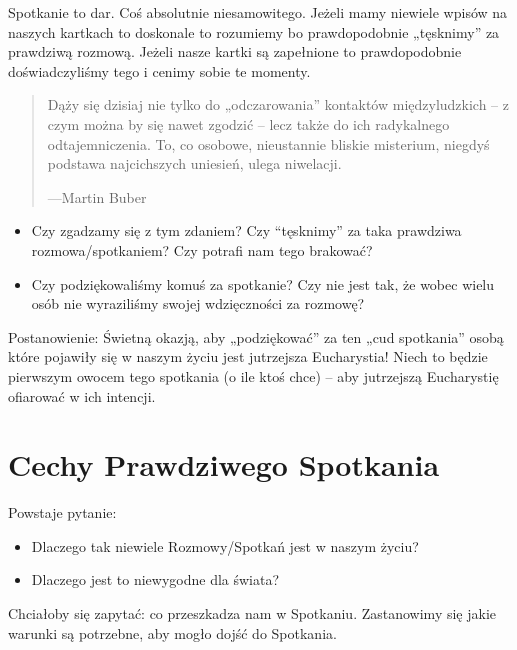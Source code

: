 \documentclass[a5paper,10pt,polish]{book}
\begin{document}
Spotkanie to dar. Coś absolutnie niesamowitego. Jeżeli mamy niewiele wpisów na naszych kartkach to doskonale to rozumiemy bo prawdopodobnie „tęsknimy” za prawdziwą rozmową. Jeżeli nasze kartki są zapełnione to prawdopodobnie doświadczyliśmy tego i cenimy sobie te momenty.
\begin{quote}

Dąży się dzisiaj nie tylko do „odczarowania” kontaktów międzyludzkich – z czym można by się nawet zgodzić – lecz także do ich radykalnego odtajemniczenia. To, co osobowe, nieustannie bliskie misterium, niegdyś podstawa najcichszych uniesień, ulega niwelacji.

\begin{flushright}
---Martin Buber
\end{flushright}
\end{quote}
\begin{itemize}
\item {} 
Czy zgadzamy się z tym zdaniem? Czy ``tęsknimy'' za taka prawdziwa rozmowa/spotkaniem? Czy potrafi nam tego brakować?

\item {} 
Czy podziękowaliśmy komuś za spotkanie? Czy nie jest tak, że wobec wielu osób nie wyraziliśmy swojej wdzięczności za rozmowę?

\end{itemize}

Postanowienie: Świetną okazją, aby „podziękować” za ten „cud spotkania” osobą które pojawiły się w naszym życiu jest jutrzejsza Eucharystia! Niech to będzie pierwszym owocem tego spotkania (o ile ktoś chce) – aby jutrzejszą Eucharystię ofiarować w ich intencji.


\section{Cechy Prawdziwego Spotkania}
\label{babice2006-jesien-knurow/spotkanie1:cechy-prawdziwego-spotkania}
Powstaje pytanie:
\begin{itemize}
\item {} 
Dlaczego tak niewiele Rozmowy/Spotkań jest w naszym życiu?

\item {} 
Dlaczego jest to niewygodne dla świata?

\end{itemize}

Chciałoby się zapytać: co przeszkadza nam w Spotkaniu. Zastanowimy się jakie warunki są potrzebne, aby mogło dojść do Spotkania.
\end{document}
